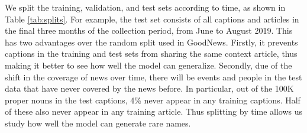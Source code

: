 \documentclass[10pt,twocolumn,letterpaper]{article}
\begin{document}
We split the training, validation, and test sets according to time, as shown in
Table \ref{tab:splits}. For example, the test set consists of all captions and
articles in the final three months of the collection period, from June to
August 2019. This has two advantages over the random split used in GoodNews.
Firstly, it prevents captions in the training and test sets from sharing the
same context article, thus making it better to see how well the model can
generalize. Secondly, due of the shift in the coverage of news over time, there
will be events and people in the test data that have never covered by the news
before. In particular, out of the 100K proper nouns in the test captions, 4\%
never appear in any training captions. Half of these also never appear in any
training article. Thus splitting by time allows us study how well the model can
generate rare names.
\end{document}
